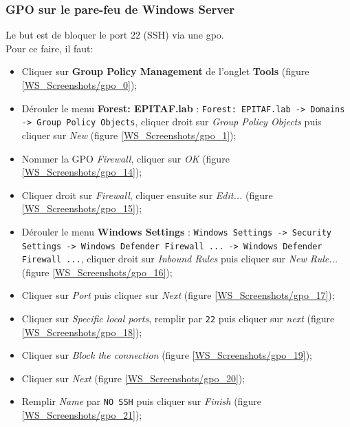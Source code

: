 \subsubsection{GPO sur le pare-feu de Windows Server}

Le but est de bloquer le port 22 (SSH) via une gpo. \\
Pour ce faire, il faut:
\begin{itemize}
    \item Cliquer sur \textbf{Group Policy Management} de l'onglet \textbf{Tools} (figure \ref{WS_Screenshots/gpo_0});
    \item Dérouler le menu \textbf{Forest: EPITAF.lab} : \texttt{Forest: EPITAF.lab -> Domains -> Group Policy Objects}, cliquer droit sur \textit{Group Policy Objects} puis cliquer sur \textit{New} (figure \ref{WS_Screenshots/gpo_1});
    \item Nommer la GPO \textit{Firewall}, cliquer sur \textit{OK} (figure \ref{WS_Screenshots/gpo_14});
    \item Cliquer droit sur \textit{Firewall}, cliquer ensuite sur \textit{Edit...} (figure \ref{WS_Screenshots/gpo_15});
    \item Dérouler le menu \textbf{Windows Settings} : \texttt{Windows Settings -> Security Settings -> Windows Defender Firewall ... -> Windows Defender Firewall ...}, cliquer droit sur \textit{Inbound Rules} puis cliquer sur \textit{New Rule...} (figure \ref{WS_Screenshots/gpo_16});
    \item Cliquer sur \textit{Port} puis cliquer sur \textit{Next} (figure \ref{WS_Screenshots/gpo_17});
    \item Cliquer sur \textit{Specific local ports}, remplir par \texttt{22} puis cliquer sur \textit{next} (figure \ref{WS_Screenshots/gpo_18});
    \item Cliquer sur \textit{Block the connection} (figure \ref{WS_Screenshots/gpo_19});
    \item Cliquer sur \textit{Next} (figure \ref{WS_Screenshots/gpo_20});
    \item Remplir \textit{Name} par \texttt{NO SSH} puis cliquer sur \textit{Finish} (figure \ref{WS_Screenshots/gpo_21});
\end{itemize}

